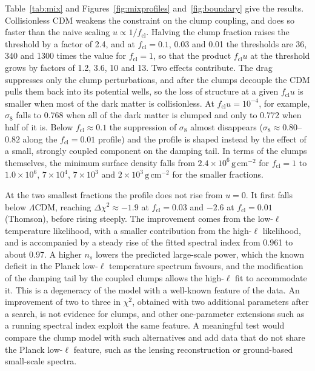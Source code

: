 \documentclass[11pt,a4paper]{article}
\newcommand{\cl}{\mathrm{cl}}
\newcommand{\dchi}{\Delta\chi^2}
\begin{document}
Table~\ref{tab:mix} and Figures~\ref{fig:mixprofiles} and~\ref{fig:boundary} give the results. Collisionless CDM weakens the constraint on the clump coupling, and does so faster than the naive scaling $u \propto 1/f_\cl$. Halving the clump fraction raises the threshold by a factor of 2.4, and at $f_\cl = 0.1$, 0.03 and 0.01 the thresholds are 36, 340 and 1300 times the value for $f_\cl = 1$, so that the product $f_\cl u$ at the threshold grows by factors of 1.2, 3.6, 10 and 13. Two effects contribute. The drag suppresses only the clump perturbations, and after the clumps decouple the CDM pulls them back into its potential wells, so the loss of structure at a given $f_\cl u$ is smaller when most of the dark matter is collisionless. At $f_\cl u = 10^{-4}$, for example, $\sigma_8$ falls to 0.768 when all of the dark matter is clumped and only to 0.772 when half of it is. Below $f_\cl \approx 0.1$ the suppression of $\sigma_8$ almost disappears ($\sigma_8 \approx 0.80$--$0.82$ along the $f_\cl = 0.01$ profile) and the profile is shaped instead by the effect of a small, strongly coupled component on the damping tail. In terms of the clumps themselves, the minimum surface density falls from $2.4\times10^{6}\,\mathrm{g\,cm^{-2}}$ for $f_\cl = 1$ to $1.0\times10^{6}$, $7\times10^{4}$, $7\times10^{3}$ and $2\times10^{3}\,\mathrm{g\,cm^{-2}}$ for the smaller fractions.

At the two smallest fractions the profile does not rise from $u=0$. It first falls below $\Lambda$CDM, reaching $\dchi \approx -1.9$ at $f_\cl = 0.03$ and $-2.6$ at $f_\cl = 0.01$ (Thomson), before rising steeply. The improvement comes from the low-$\ell$ temperature likelihood, with a smaller contribution from the high-$\ell$ likelihood, and is accompanied by a steady rise of the fitted spectral index from 0.961 to about 0.97. A higher $n_s$ lowers the predicted large-scale power, which the known deficit in the Planck low-$\ell$ temperature spectrum favours, and the modification of the damping tail by the coupled clumps allows the high-$\ell$ fit to accommodate it. This is a degeneracy of the model with a well-known feature of the data. An improvement of two to three in $\chi^2$, obtained with two additional parameters after a search, is not evidence for clumps, and other one-parameter extensions such as a running spectral index exploit the same feature. A meaningful test would compare the clump model with such alternatives and add data that do not share the Planck low-$\ell$ feature, such as the lensing reconstruction or ground-based small-scale spectra.
\end{document}
